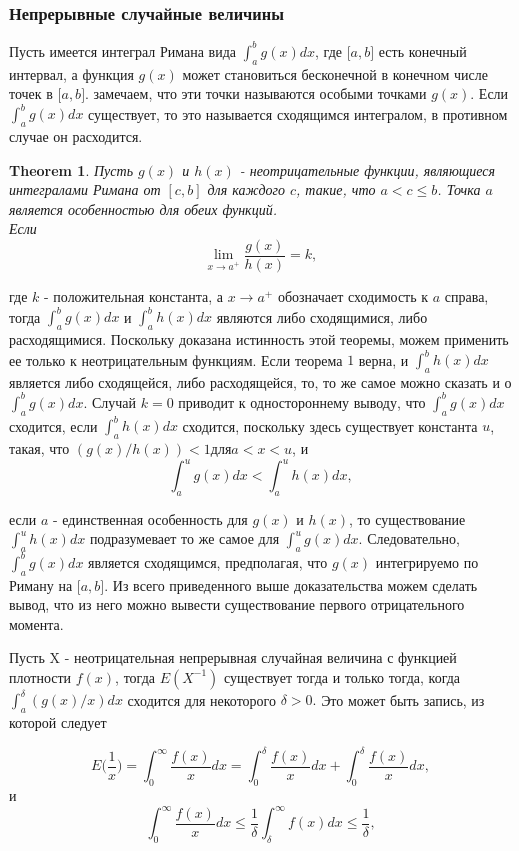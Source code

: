 \documentclass[13pt]{article}
\newtheorem{theorem}{Theorem}
\begin{document}
\subsubsection{Непрерывные случайные величины }\label{subSection 1.2}
Пусть имеется интеграл Римана вида $\int_{a}^{b}g(x) dx$, где $\big[a, b \big]$ есть конечный интервал, а функция $g(x)$ может становиться бесконечной в конечном числе точек в $\big[a, b \big]$. замечаем, что эти точки называются особыми точками $g(x)$. Если $\int_{a}^{b} g(x) dx$ существует, то это называется сходящимся интегралом, в противном случае он расходится.
\begin{theorem} \label{theorem 1}
    Пусть $g (x)$ и $h (x)$ - неотрицательные функции, являющиеся интегралами Римана от $[c,b]$ для каждого $c$, такие, что $a<c\le b$. Точка $a$ является особенностью для обеих функций.\\ 
Если 
\[
\lim_{x \to a^{+}} \frac{g(x)}{h(x)} = k,
\]
\end{theorem}
где $k$ - положительная константа, а $x \to a^{+}$ обозначает сходимость к $a$ справа, тогда $\int_a^b g(x)dx$ и $\int_a^b h(x)dx$ являются либо сходящимися, либо расходящимися.
Поскольку доказана истинность этой теоремы, можем применить ее только к неотрицательным функциям. Если теорема $1$ верна, и $\int_{a}^{b} h(x)dx$ является либо сходящейся, либо расходящейся, то, то же самое можно сказать и о $\int_a^b g(x)dx$. Случай $k=0$ приводит к одностороннему выводу, что $\int_{a}^{b} g(x)dx$ сходится, если $\int_a^b h(x) dx$ сходится, поскольку здесь существует константа $u$, такая, что $(g(x)/h(x))<1 \textbf{для} a < x < u$, и
\[
\int_a^u g(x)dx<\int_a^uh(x)dx,
\]

если $a$ - единственная особенность для $g(x)$ и $h(x)$, то существование $\int_a^ uh(x)dx$ подразумевает то же самое для $\int_a^ ug(x)dx$. Следовательно, $ \int_a ^ bg (x) dx$ является сходящимся, предполагая, что $g (x)$ интегрируемо по Риману на $ \big [a,b\big]$. Из всего приведенного выше доказательства можем сделать вывод, что из него можно вывести существование первого отрицательного момента.

Пусть X - неотрицательная непрерывная случайная величина с функцией плотности $f(x)$, тогда $E(X ^ {-1})$ существует тогда и только тогда, когда $\int_a^{\delta} (g(x)/x)dx$ сходится для некоторого $\delta > 0.$
Это может быть запись, из которой следует

\[
E\Big(\frac{1}{x}\Big)= \int_0^\infty \frac{f(x)}{x}dx = \int_0^\delta \frac{f(x)}{x}dx + \int_0^\delta \frac{f(x)}{x}dx,
\]
и 
\[
\int_0^\infty \frac{f(x)}{x}dx \le \frac{1}{\delta}\int_\delta^\infty f(x)dx \le \frac{1}{\delta},
\]
\end{document}
